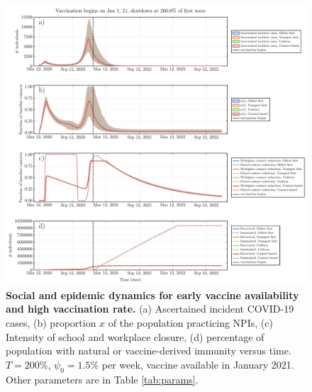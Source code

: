     \begin{figure}[H]
    \centering
    \includegraphics[width = 16 cm]{appendices/FigureS7.pdf}
    \caption[Social and epidemic dynamics for early vaccine availability and high vaccination rate.]{\textbf{Social and epidemic dynamics for early vaccine availability and high vaccination rate.} (a) Ascertained incident COVID-19 cases, (b) proportion $x$ of the population practicing NPIs, (c) Intensity of school and workplace closure, (d) percentage of population with natural or vaccine-derived immunity versus time. $T=200 \%$, $\psi_0=1.5 \%$ per week, vaccine available in January 2021.   Other parameters are in Table \ref{tab:params}.}
    \label{s7}
    \end{figure}
    
    \clearpage 
    
